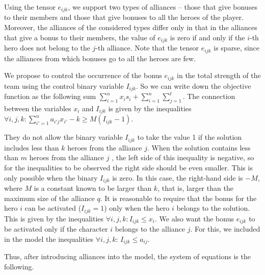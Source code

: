 \documentclass{article}
\begin{document}
Using the tensor $e_{ijk} $, we support two types of alliances -- those that give bonuses to their members and those that give bonuses to all the heroes of the player. Moreover, the alliances of the considered types differ only in that in the alliances that give a bonus to their members, the value of $e_{ijk} $ is zero if and only if the $i$-th hero does not belong to the $j$-th alliance. Note that the tensor $ e_{ijk} $ is sparse, since the alliances from which bonuses go to all the heroes are few.

We propose to control the occurrence of the bonus $ e_{ijk} $ in the total strength of the team using the control binary variable $ I_{ijk} $.
So we can write down the objective function as the following sum $ \sum_{i = 1}^{n} x_i s_i + \sum_{i = 1}^{n} \sum_{j = 1}^{t} $.
The connection between the variables $ x_{i} $ and $ I_{ijk} $ is given by the inequalities
$\forall{i,j,k} :  \sum_{i'=1}^{n} a_{i'j} x_{i'} - k \ge M( I_{ijk} - 1)$. 

They do not allow the binary variable $ I_{ijk} $ to take the value 1 if the solution includes less than $k$ heroes from the alliance $j$. When the solution contains less than $m$ heroes from the alliance $j$ , the left side of this inequality is negative, so for the inequalities to be observed the right side should be even smaller. This is only possible when the binary $ I_{ijk} $ is zero. In this case, the right-hand side is $-M $, where $M$ is a constant known to be larger than $ k $, that is, larger than the maximum size of the alliance $q$.
It is reasonable to require that the bonus for the hero $i$ can be activated ($ I_{ijk} = 1 $) only when the hero $i$ belongs to the solution. This is given by the inequalities $ \forall {i, j, k}: I_{ijk} \le x_i $. We also want the bonus $ e_ {ijk} $ to be activated only if the character $ i $ belongs to the alliance $ j $. For this, we included  in the model the inequalities $ \forall{i, j, k} :\, I_{ijk} \le a_{ij} $.

Thus, after introducing alliances into the model, the system of equations is the following.
\end{document}
